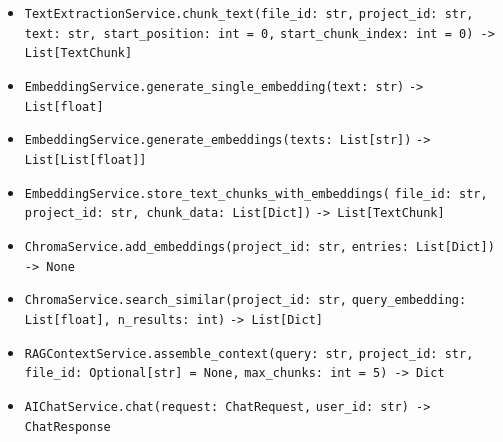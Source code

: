 {\small
\begin{itemize}
    \item \texttt{TextExtractionService.chunk\_text(file\_id: str,} \texttt{project\_id: str, text: str, start\_position: int = 0,} \texttt{start\_chunk\_index: int = 0) -> List[TextChunk]}
    \item \texttt{EmbeddingService.generate\_single\_embedding(text: str)} \texttt{-> List[float]}
    \item \texttt{EmbeddingService.generate\_embeddings(texts: List[str])} \texttt{-> List[List[float]]}
    \item \texttt{EmbeddingService.store\_text\_chunks\_with\_embeddings(} \texttt{file\_id: str, project\_id: str, chunk\_data: List[Dict])} \texttt{-> List[TextChunk]}
    \item \texttt{ChromaService.add\_embeddings(project\_id: str,} \texttt{entries: List[Dict]) -> None}
    \item \texttt{ChromaService.search\_similar(project\_id: str,} \texttt{query\_embedding: List[float], n\_results: int)} \texttt{-> List[Dict]}
    \item \texttt{RAGContextService.assemble\_context(query: str,} \texttt{project\_id: str, file\_id: Optional[str] = None,} \texttt{max\_chunks: int = 5) -> Dict}
    \item \texttt{AIChatService.chat(request: ChatRequest,} \texttt{user\_id: str) -> ChatResponse}
\end{itemize}
}